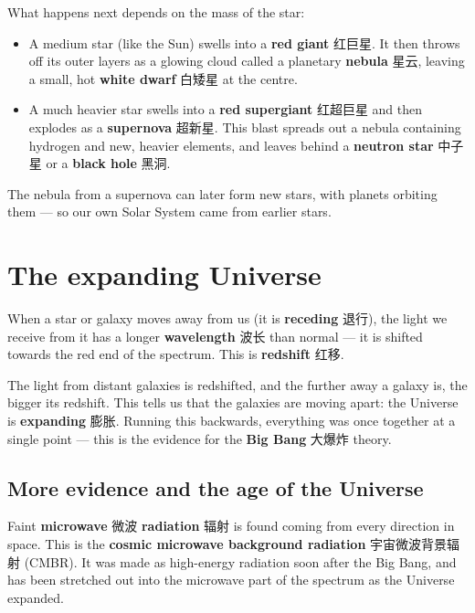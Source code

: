 \documentclass[11pt]{article}
\begin{document}
What happens next depends on the mass of the star:

\begin{itemize}
\item A medium star (like the Sun) swells into a \textbf{red giant} 红巨星. It then throws off its outer layers as a glowing cloud called a planetary \textbf{nebula} 星云, leaving a small, hot \textbf{white dwarf} 白矮星 at the centre.

\item A much heavier star swells into a \textbf{red supergiant} 红超巨星 and then explodes as a \textbf{supernova} 超新星. This blast spreads out a nebula containing hydrogen and new, heavier elements, and leaves behind a \textbf{neutron star} 中子星 or a \textbf{black hole} 黑洞.

\end{itemize}

The nebula from a supernova can later form new stars, with planets orbiting them — so our own Solar System came from earlier stars.

\section*{The expanding Universe}

When a star or galaxy moves away from us (it is \textbf{receding} 退行), the light we receive from it has a longer \textbf{wavelength} 波长 than normal — it is shifted towards the red end of the spectrum. This is \textbf{redshift} 红移.

The light from distant galaxies is redshifted, and the further away a galaxy is, the bigger its redshift. This tells us that the galaxies are moving apart: the Universe is \textbf{expanding} 膨胀. Running this backwards, everything was once together at a single point — this is the evidence for the \textbf{Big Bang} 大爆炸 theory.

\subsection*{More evidence and the age of the Universe}

Faint \textbf{microwave} 微波 \textbf{radiation} 辐射 is found coming from every direction in space. This is the \textbf{cosmic microwave background radiation} 宇宙微波背景辐射 (CMBR). It was made as high-energy radiation soon after the Big Bang, and has been stretched out into the microwave part of the spectrum as the Universe expanded.
\end{document}
